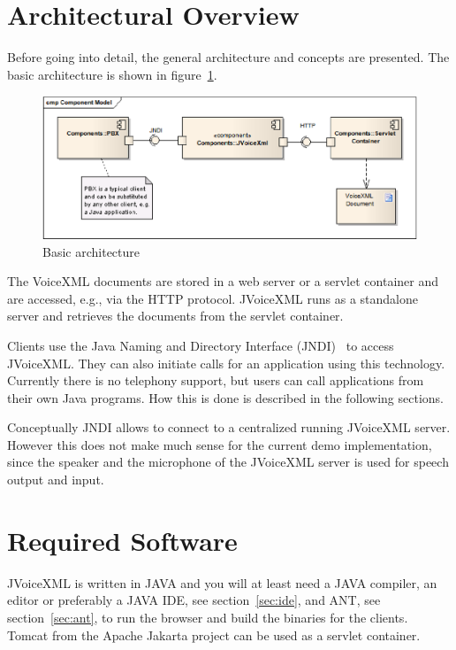 \documentclass[11pt,a4paper]{article}
\begin{document}
\section{Architectural Overview}
\label{sec:arch-overv}

Before going into detail, the general architecture and concepts are presented.
The basic architecture is shown in figure~\ref{fig:architecture}.

\begin{figure}
\label{fig:architecture}
\caption{Basic architecture}
\begin{center}
\includegraphics[scale=0.3]{architecture.eps}
\end{center}
\end{figure}

The VoiceXML documents are stored in a web server or a servlet container
and are accessed, e.g., via the HTTP protocol.
JVoiceXML runs as a standalone server and retrieves the documents from
the servlet container. 

Clients use the Java Naming and Directory Interface (JNDI)~\cite{sun:jndi} to 
access JVoiceXML. They can also initiate calls for an application using this 
technology. Currently there is no telephony support, but users can call 
applications from their own Java programs. How this is done is described in the 
following sections.

Conceptually JNDI allows to connect to a centralized running JVoice\-XML 
server. However this does not make much sense for the current demo 
implementation, since the speaker and the microphone of the JVoiceXML server
is used for speech output and input.

\section{Required Software}
\label{sec:required-software}

JVoiceXML is written in JAVA and you will at least need a JAVA compiler, an 
editor or preferably a JAVA IDE, see section~\ref{sec:ide}, and ANT, see 
section~\ref{sec:ant}, to run the browser and build the binaries for the 
clients. Tomcat from the Apache Jakarta project can be used as a servlet
container.
\end{document}
